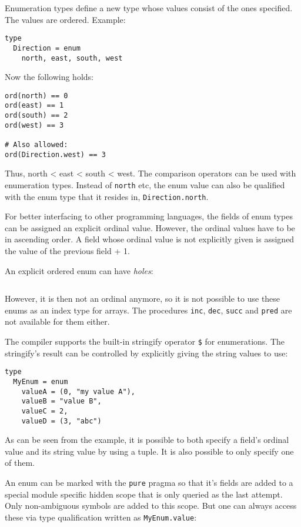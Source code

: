 Enumeration types define a new type whose values consist of the ones
specified. The values are ordered. Example:

\begin{verbatim}
type
  Direction = enum
    north, east, south, west
\end{verbatim}

Now the following holds:

\begin{verbatim}
ord(north) == 0
ord(east) == 1
ord(south) == 2
ord(west) == 3

# Also allowed:
ord(Direction.west) == 3
\end{verbatim}

Thus, north \textless{} east \textless{} south \textless{} west. The
comparison operators can be used with enumeration types. Instead of
\texttt{north} etc, the enum value can also be qualified with the enum
type that it resides in, \texttt{Direction.north}.

For better interfacing to other programming languages, the fields of
enum types can be assigned an explicit ordinal value. However, the
ordinal values have to be in ascending order. A field whose ordinal
value is not explicitly given is assigned the value of the previous
field + 1.

An explicit ordered enum can have \emph{holes}:

\begin{verbatim}
\end{verbatim}

However, it is then not an ordinal anymore, so it is not possible to use
these enums as an index type for arrays. The procedures \texttt{inc},
\texttt{dec}, \texttt{succ} and \texttt{pred} are not available for them
either.

The compiler supports the built-in stringify operator \texttt{\$} for
enumerations. The stringify's result can be controlled by explicitly
giving the string values to use:

\begin{verbatim}
type
  MyEnum = enum
    valueA = (0, "my value A"),
    valueB = "value B",
    valueC = 2,
    valueD = (3, "abc")
\end{verbatim}

As can be seen from the example, it is possible to both specify a
field's ordinal value and its string value by using a tuple. It is also
possible to only specify one of them.

An enum can be marked with the \texttt{pure} pragma so that it's fields
are added to a special module specific hidden scope that is only queried
as the last attempt. Only non-ambiguous symbols are added to this scope.
But one can always access these via type qualification written as
\texttt{MyEnum.value}:

